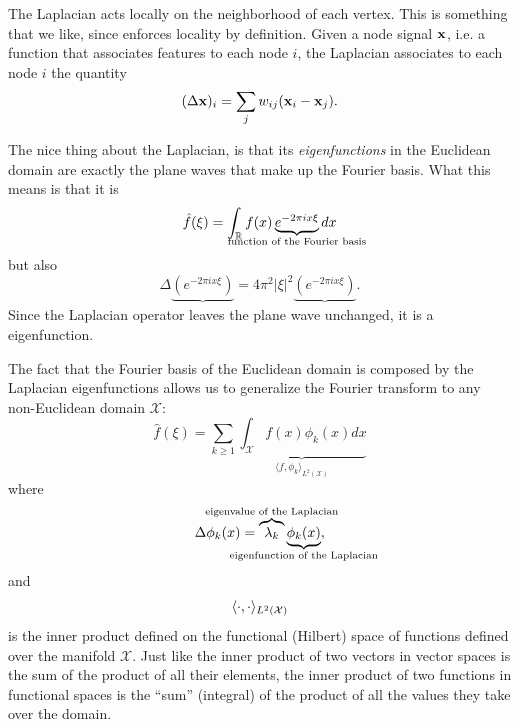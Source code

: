 The Laplacian acts locally on the neighborhood of each vertex. This is something that we like, since enforces locality by definition. Given a node signal $\vb{x}$, i.e. a function that associates features to each node $i$, the Laplacian associates to each node $i$ the quantity
\begin{equation}
    (\Delta \vb{x})_i = \sum_j w_{ij} (\vb{x}_i - \vb{x}_j).
    \label{eq:12:4:2:graph-laplacian}
\end{equation}

The nice thing about the Laplacian, is that its \emph{eigenfunctions} in the Euclidean domain are exactly the plane waves that make up the Fourier basis. What this means is that it is
\begin{equation}
    \hat{f}(\xi) = \int_{\mathbb{R}} f(x) \underbrace{e^{-2\pi i x \xi}}_{\mathclap{\text{function of the Fourier basis}}} dx 
\end{equation}
but also
\begin{equation}
    \Delta \underbrace{\left(e^{-2\pi i x \xi}\right)}_{} = 4 \pi^2 |\xi|^2 \underbrace{\left(e^{-2\pi i x \xi}\right)}_{}.
\end{equation}
Since the Laplacian operator leaves the plane wave unchanged, it is a eigenfunction.

The fact that the Fourier basis of the Euclidean domain is composed by the Laplacian eigenfunctions allows us to generalize the Fourier transform to any non-Euclidean domain $\mathcal{X}$:
\begin{equation}
    \hat{f}(\xi) = \sum_{k \geq 1} \underbrace{\int_{\mathcal{X}} f(x) \phi_k(x) dx}_{\langle {f, \phi_k \rangle }_{L^2(\mathcal{X})}} 
    \label{eq:12:4:2:non-euclidean-fourier}
\end{equation}
where 
\begin{equation}
    \Delta \phi_k(x) = \overbrace{\lambda_k}^{\mathclap{\text{eigenvalue of the Laplacian}}} \underbrace{\phi_k(x)}_{\mathclap{\text{eigenfunction of the Laplacian}}},
\end{equation}
and 
\begin{equation}
    \langle \cdot, \cdot \rangle_{L^2(\mathcal{X})}
\end{equation}
is the inner product defined on the functional (Hilbert) space of functions defined over the manifold $\mathcal{X}$. Just like the inner product of two vectors in vector spaces is the sum of the product of all their elements, the inner product of two functions in functional spaces is the ``sum'' (integral) of the product of all the values they take over the domain.

